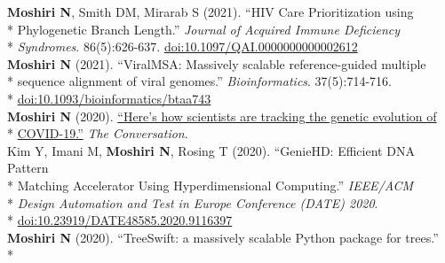 \documentclass[margin,line]{res}
\begin{document}
\begin{resume}
\hspace*{4mm} \textbf{Moshiri N}, Smith DM, Mirarab S (2021). ``HIV Care Prioritization using\\*
\hspace*{9mm} Phylogenetic Branch Length.'' \textit{Journal of Acquired Immune Deficiency}\\*\vspace{2mm}
\hspace*{8mm} \textit{Syndromes}. 86(5):626-637. \href{https://doi.org/10.1097/QAI.0000000000002612}{doi:10.1097/QAI.0000000000002612}\\
\hspace*{4mm} \textbf{Moshiri N} (2021). ``ViralMSA: Massively scalable reference-guided multiple\\*
\hspace*{9mm} sequence alignment of viral genomes.'' \textit{Bioinformatics}. 37(5):714-716.\\*\vspace{2mm}
\hspace*{8mm} \href{https://doi.org/10.1093/bioinformatics/btaa743}{doi:10.1093/bioinformatics/btaa743}\\
\hspace*{4mm} \textbf{Moshiri N} (2020). \href{https://theconversation.com/heres-how-scientists-are-tracking-the-genetic-evolution-of-covid-19-134201}{``Here's how scientists are tracking the genetic evolution of}\\*\vspace{2mm}
\hspace*{8mm} \href{https://theconversation.com/heres-how-scientists-are-tracking-the-genetic-evolution-of-covid-19-134201}{COVID-19.''} \textit{The Conversation}.\\
\hspace*{4mm} Kim Y, Imani M, \textbf{Moshiri N}, Rosing T (2020). ``GenieHD: Efficient DNA Pattern\\*
\hspace*{9mm}  Matching Accelerator Using Hyperdimensional Computing.'' \textit{IEEE/ACM}\\*
\hspace*{9mm} \textit{Design Automation and Test in Europe Conference (DATE) 2020}.\\*\vspace{2mm}
\hspace*{8mm} \href{https://doi.org/10.23919/DATE48585.2020.9116397}{doi:10.23919/DATE48585.2020.9116397}\\
\hspace*{4mm} \textbf{Moshiri N} (2020). ``TreeSwift: a massively scalable Python package for trees.''\\*\vspace{2mm}

\end{resume}
\end{document}
